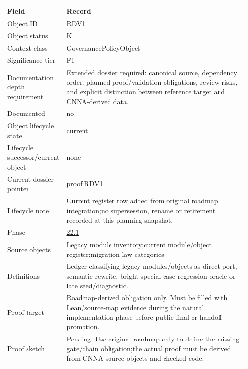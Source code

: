 \begin{longtable}{L{0.16\linewidth} L{0.81\linewidth}}
\hline
\textbf{Field} & \textbf{Record}\\
\hline
Object ID & \hyperlink{object-row-RDV1}{RDV1}\\
\hline\addlinespace[0.20em]
Object status & K\\
\hline\addlinespace[0.20em]
Context class & GovernancePolicyObject\\
\hline\addlinespace[0.20em]
Significance tier & F1\\
\hline\addlinespace[0.20em]
Documentation depth requirement & Extended dossier required: canonical source, dependency order, planned proof/\allowbreak{}validation obligations, review risks, and explicit distinction between reference target and CNNA-derived data.\\
\hline\addlinespace[0.20em]
Documented & no\\
\hline\addlinespace[0.20em]
Object lifecycle state & current\\
\hline\addlinespace[0.20em]
Lifecycle successor/\allowbreak{}current object & none\\
\hline\addlinespace[0.20em]
Current dossier pointer & proof:RDV1\\
\hline\addlinespace[0.20em]
Lifecycle note & Current register row added from original roadmap integration;\newline no supersession, rename or retirement recorded at this planning snapshot.\\
\hline\addlinespace[0.20em]
Phase & \hyperlink{phase-row-22-1}{22.1}\\
\hline\addlinespace[0.20em]
Source objects & Legacy module inventory;\newline current module/\allowbreak{}object register;\newline migration law categories.\\
\hline\addlinespace[0.20em]
Definitions & Ledger classifying legacy modules/\allowbreak{}objects as direct port, semantic rewrite, bright-special-case regression oracle or late seed/\allowbreak{}diagnostic.\\
\hline\addlinespace[0.20em]
Proof target & Roadmap-derived obligation only. Must be filled with Lean/\allowbreak{}source-map evidence during the natural implementation phase before public-final or handoff promotion.\\
\hline\addlinespace[0.20em]
Proof sketch & Pending. Use original roadmap only to define the missing gate/\allowbreak{}chain obligation;\newline the actual proof must be derived from CNNA source objects and checked code.\\

\end{longtable}
